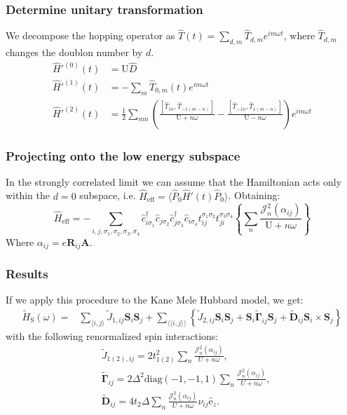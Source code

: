 \documentclass{beamer}
\newcommand{\bs}[1] {\boldsymbol{#1}}
\begin{document}

\begin{frame}
\frametitle{Determine unitary transformation}
We decompose the hopping operator as $\hat{T}(t) = \sum_{d,m} \hat{T}_{d,m}e^{im\omega t}$, where $\hat{T}_{d,m}$ changes the doublon number by $d$.
\begin{align*}
\hat{H}'^{(0)}(t) &= \text{U}\hat{D} \\
\hat{H}'^{(1)}(t) &= -\sum_m \hat{T}_{0,m}(t)e^{im\omega t} \\
\hat{H}'^{(2)}(t) &= \frac{1}{2}\sum_{mn} \left( \frac{\left[\hat{T}_{1n}, \hat{T}_{-1(m-n)} \right]}{\text{U}+n\omega} - \frac{\left[\hat{T}_{-1n}, \hat{T}_{1(m-n)} \right]}{\text{U}-n\omega} \right) e^{im\omega t}
\end{align*}
\end{frame}


\begin{frame}
\frametitle{Projecting onto the low energy subspace}
In the strongly correlated limit we can assume that the Hamiltonian acts only within the $d=0$ subspace, i.e. $\hat{H}_{\text{eff}}=\langle \hat{P}_0\hat{H}'(t)\hat{P}_0 \rangle$. Obtaining:
\begin{equation*}
\hat{H}_{\text{eff}} = - \sum_{i,j, \sigma_1, \sigma_2, \sigma_3, \sigma_4}\hat{c}_{i \sigma_1}^\dagger \hat{c}_{j \sigma_2} \hat{c}_{j \sigma_3}^\dagger \hat{c}_{i \sigma_4} t_{ij}^{\sigma_1 \sigma_2} t_{ji}^{\sigma_3 \sigma_4} \left\{ \sum_{n} \frac{\mathcal{J}_{n}^2(\alpha_{ij})}{\text{U}+n\omega} \right\}
\end{equation*}
Where $\alpha_{ij} = e\bs{R}_{ij}\bs{A}$.
\end{frame}


\begin{frame}
\frametitle{Results}
If we apply this procedure to the Kane Mele Hubbard model, we get:
\begin{align*}
\tilde{H}_{\text{S}}(\omega) =& \sum_{\langle i,j \rangle} \tilde{J}_{1,ij} \bs{S}_i\bs{S}_j + \sum_{\langle \langle i,j \rangle \rangle} \left\{ \tilde{J}_{2,ij}\bs{S}_i\bs{S}_j + \bs{S}_i \tilde{\bs{\Gamma}}_{ij} \bs{S}_j + \tilde{\bs{D}}_{ij} \bs{S}_i \times \bs{S}_j \right\}
\end{align*}
with the following renormalized spin interactions:
\begin{align*}
&\tilde{J}_{1(2),ij} = 2t_{1(2)}^2\sum_n\frac{\mathcal{J}_{n}^2(\alpha_{ij})}{U+n\omega}, \\
&\tilde{\bs{\Gamma}}_{ij} = 2\Delta^2 \text{diag}(-1,-1,1) \sum_n\frac{\mathcal{J}_{n}^2(\alpha_{ij})}{U+n\omega},\\
&\tilde{\bs{D}}_{ij} = 4 t_2 \Delta \sum_n\frac{\mathcal{J}_{n}^2(\alpha_{ij})}{U+n\omega} \nu_{ij} \hat{\mathrm{e}}_z.
\end{align*}
\end{frame}
\end{document}
